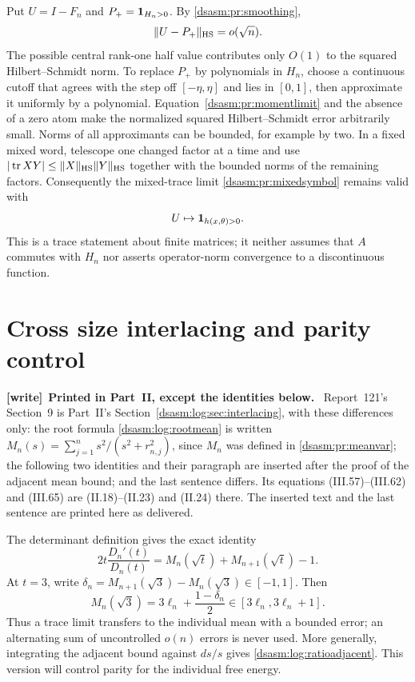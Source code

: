 \documentclass[11pt,letterpaper]{article}
\theoremstyle{remark}\newtheorem{remark}[theorem]{Remark}
\DeclareMathOperator{\tr}{tr}\DeclareMathOperator{\Ran}{Ran}
\newenvironment{writenote}[1][]{\par\smallskip\begingroup\small
 \noindent\textbf{[write]}\if\relax\detokenize{#1}\relax\else~\textbf{#1.}\fi\ }%
 {\par\endgroup\smallskip}
\begin{document}
Put $U=I-F_n$ and $P_+=\mathbf1_{H_n>0}$. By \eqref{dsasm:pr:smoothing},
\begin{equation}\label{dsasm:pr:HSsmooth}
 \|U-P_+\|_{\rm HS}=o(\sqrt n).
\end{equation}
The possible central rank-one half value contributes only $O(1)$
to the squared Hilbert--Schmidt norm. To replace $P_+$ by polynomials
in $H_n$, choose a continuous cutoff that agrees with the step off
$[-\eta,\eta]$ and lies in $[0,1]$, then approximate it uniformly by
a polynomial. Equation~\eqref{dsasm:pr:momentlimit} and the absence of a zero
atom make the normalized squared Hilbert--Schmidt error arbitrarily
small. Norms of all approximants can be bounded, for example by two.
In a fixed mixed word, telescope one changed factor at a time and use
$|\tr XY|\le\|X\|_{\rm HS}\|Y\|_{\rm HS}$ together with the bounded
norms of the remaining factors. Consequently the mixed-trace limit
\eqref{dsasm:pr:mixedsymbol} remains valid with
\begin{equation}\label{dsasm:pr:Usymbol}
 U\mapsto\mathbf1_{h(x,\theta)>0}.
\end{equation}
This is a trace statement about finite matrices; it neither assumes
that $A$ commutes with $H_n$ nor asserts operator-norm convergence to
a discontinuous function.

\section{Cross size interlacing and parity control}
\label{dsasm:pr:sec:interlacing}
\begin{writenote}[Printed in Part~II, except the identities below]
Report~121's Section~9 is Part~II's Section~\ref{dsasm:log:sec:interlacing}, with these differences only: the root formula \eqref{dsasm:log:rootmean} is written $M_n(s)=\sum_{j=1}^n s^2/(s^2+r_{n,j}^2)$, since $M_n$ was defined in \eqref{dsasm:pr:meanvar}; the following two identities and their paragraph are inserted after the proof of the adjacent mean bound; and the last sentence differs. Its equations (III.57)--(III.62) and (III.65) are (II.18)--(II.23) and (II.24) there. The inserted text and the last sentence are printed here as delivered.
\end{writenote}
\setcounter{equation}{62}
The determinant definition gives the exact identity
\begin{equation}\label{dsasm:pr:adjderivative}
 2t\frac{D_n'(t)}{D_n(t)}=M_n(\sqrt t)+M_{n+1}(\sqrt t)-1.
\end{equation}
At $t=3$, write $\delta_n=M_{n+1}(\sqrt3)-M_n(\sqrt3)\in[-1,1]$.
Then
\begin{equation}\label{dsasm:pr:meanbracket}
 M_n(\sqrt3)=3\ell_n+\frac{1-\delta_n}{2}
 \in[3\ell_n,3\ell_n+1].
\end{equation}
Thus a trace limit transfers to the individual mean with a bounded
error; an alternating sum of uncontrolled $o(n)$ errors is never used.
More generally, integrating the adjacent bound against $ds/s$ gives
\eqref{dsasm:log:ratioadjacent}.
\setcounter{equation}{65}
This version will control parity for the individual free energy.
\end{document}
